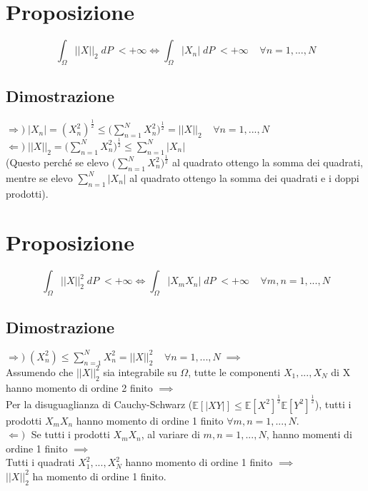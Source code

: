\documentclass{article}
\begin{document}
\section*{Proposizione}
\[ \int_{\Omega}^{} ||X||_{2} \; dP \; < +\infty \iff \int_{\Omega}^{}|X_{n}| \; dP \; < +\infty \; \; \; \; \forall n = 1,...,N \]

\subsection*{Dimostrazione}
$\Rightarrow) \; |X_{n}| = (X_{n}^{2})^{\frac{1}{2}} \leq \Big( \sum_{n=1}^{N}X_{n}^{2} \Big)^{\frac{1}{2}} = ||X||_{2} \; \; \; \; \forall n=1,...,N$\\
$\Leftarrow) \; ||X||_{2} = \Big( \sum_{n=1}^{N}X_{n}^{2} \Big)^{\frac{1}{2}} \leq \sum_{n=1}^{N}|X_{n}|$\\
(Questo perché se elevo $\Big( \sum_{n=1}^{N}X_{n}^{2} \Big)^{\frac{1}{2}}$ al quadrato ottengo la somma dei quadrati, mentre se elevo $\sum_{n=1}^{N}|X_{n}|$ al quadrato ottengo la somma dei quadrati e i doppi prodotti).

\section*{Proposizione}
\[ \int_{\Omega}^{} ||X||_{2}^{2} \; dP \; < +\infty \iff \int_{\Omega}^{}|X_{m}X_{n}| \; dP \; < +\infty \; \; \; \; \forall m,n = 1,...,N \]

\subsection*{Dimostrazione}
$\Rightarrow) \;  (X_{n}^{2}) \leq \sum_{n=1}^{N}X_{n}^{2} = ||X||_{2}^{2} \; \; \; \; \forall n=1,...,N \; \implies$\\
Assumendo che $||X||_{2}^{2}$ sia integrabile su $\Omega$, tutte le componenti $X_{1},...,X_{N}$ di X hanno momento di ordine 2 finito $\implies$\\
Per la disuguaglianza di Cauchy-Schwarz ($\mathbb{E}[|XY|] \leq \mathbb{E}[X^{2}]^{\frac{1}{2}} \mathbb{E}[Y^{2}]^{\frac{1}{2}}$), tutti i prodotti $X_{m}X_{n}$ hanno momento di ordine 1 finito $\forall m,n=1,...,N$.\\
$\Leftarrow) \;$ Se tutti i prodotti $X_{m}X_{n}$, al variare di $m,n = 1,...,N$, hanno momenti di ordine 1 finito $\implies$\\
Tutti i quadrati $X_{1}^{2},...,X_{N}^{2}$ hanno momento di ordine 1 finito $\implies$\\
$||X||_{2}^{2}$ ha momento di ordine 1 finito.
\end{document}
